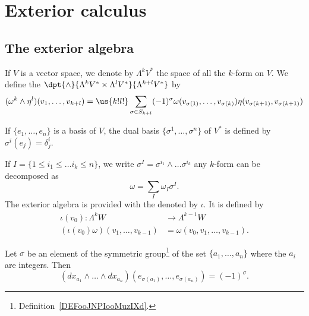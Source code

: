 \section{Exterior calculus}

\subsection{The exterior algebra}

\begin{definition}
	If $V$ is a vector space, we denote by $\Lambda^kV^*$ the space of all the $k$-form on $V$. We define the  $\dpt{\wedge}{\Lambda^kV^*\times\Lambda^lV^*}{\Lambda^{k+l}V^*}$ by
	\begin{equation}
		(\omega^k\wedge\eta^l)(v_1,\ldots,v_{k+l})
		=\us{k!l!}\sum_{\sigma\in S_{k+l}} (-1)^{\sigma}   \omega(v_{\sigma(1)},\ldots,v_{\sigma(k)})\eta(v_{\sigma(k+1)},v_{\sigma(k+1)})
	\end{equation}
\end{definition}
If $\{e_1,\ldots,e_n\}$ is a basis of $V$, the dual basis $\{\sigma^1,\ldots,\sigma^n\}$ of $V^*$ is defined by $\sigma^i(e_j)=\delta^i_j$.

If $I=\{1\leq i_1\leq\ldots i_k\leq n\}$, we write $\sigma^I=\sigma^{i_1}\wedge\ldots\sigma^{i_k}$ any $k$-form can be decomposed as
\[
	\omega=\sum_{I}\omega_I\sigma^I.
\]
The exterior algebra is provided with the  denoted by $\iota$. It is defined by\label{pg_DefProdExt}
\begin{equation}
	\begin{aligned}
		\iota(v_0)\colon\Lambda^kW             & \to \Lambda^{k-1}W               \\
		(\iota(v_0)\omega)(v_1,\ldots,v_{k-1}) & =\omega(v_0,v_1,\ldots,v_{k-1}).
	\end{aligned}
\end{equation}

\begin{lemma}
	Let \( \sigma\) be an element of the symmetric group\footnote{Definition~\ref{DEFooJNPIooMuzIXd}.} of the set \( \{ a_1,\ldots, a_n \}\) where the \( a_i\) are integers. Then
	\begin{equation}
		(dx_{a_1}\wedge\ldots \wedge dx_{a_n})(e_{\sigma(a_1)},\ldots, e_{\sigma(a_n)})=(-1)^{\sigma}.
	\end{equation}
\end{lemma}

